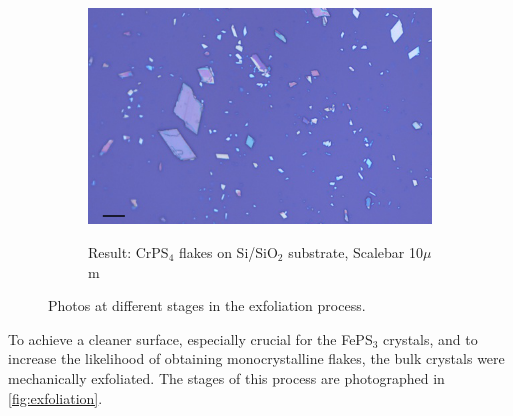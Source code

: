 \documentclass[
	twoside,
	parskip=half,
	a4paper,
]{scrbook}
\begin{document}
\begin{figure}
\begin{subfigure}[t]{.3\textwidth}
		\label{fig:exfoliation_transfer}
	\end{subfigure}
	\begin{subfigure}[t]{.3\textwidth}
		\vskip 0pt
		\includegraphics[width=\textwidth]{../../data/2023-12-04_LO_MG_NiPS3/CrPS4_50x_10um.png}\\
		\caption{Result: CrPS$_\text{4}$ flakes on Si/SiO$_\text{2}$ substrate, Scalebar 10$\mu$m}
		\label{fig:exfoliation_result}
	\end{subfigure}
	\caption{Photos at different stages in the exfoliation process.}
	\label{fig:exfoliation}
\end{figure}
To achieve a cleaner surface, especially crucial for the FePS$_3$ crystals, and to increase the likelihood of obtaining monocrystalline flakes, the bulk crystals were mechanically exfoliated.
The stages of this process are photographed in \autoref{fig:exfoliation}.
\end{document}
